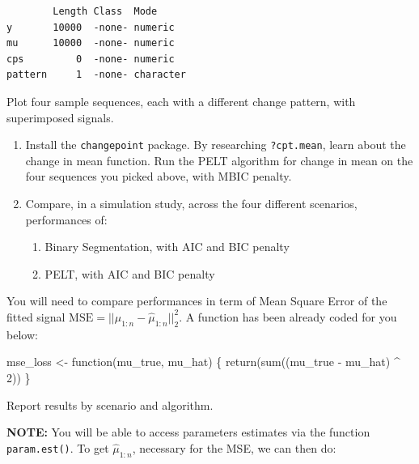 \documentclass[
  letterpaper,
  DIV=11,
  numbers=noendperiod]{scrreprt}
\newenvironment{Shaded}{\begin{snugshade}}{\end{snugshade}}
\newcommand{\AttributeTok}[1]{\textcolor[rgb]{0.40,0.45,0.13}{#1}}
\newcommand{\CommentTok}[1]{\textcolor[rgb]{0.37,0.37,0.37}{#1}}
\newcommand{\ControlFlowTok}[1]{\textcolor[rgb]{0.00,0.23,0.31}{#1}}
\newcommand{\DecValTok}[1]{\textcolor[rgb]{0.68,0.00,0.00}{#1}}
\newcommand{\FunctionTok}[1]{\textcolor[rgb]{0.28,0.35,0.67}{#1}}
\newcommand{\NormalTok}[1]{\textcolor[rgb]{0.00,0.23,0.31}{#1}}
\newcommand{\OtherTok}[1]{\textcolor[rgb]{0.00,0.23,0.31}{#1}}
\newcommand{\SpecialCharTok}[1]{\textcolor[rgb]{0.37,0.37,0.37}{#1}}
\begin{document}
\begin{verbatim}
        Length Class  Mode     
y       10000  -none- numeric  
mu      10000  -none- numeric  
cps         0  -none- numeric  
pattern     1  -none- character
\end{verbatim}

Plot four sample sequences, each with a different change pattern, with
superimposed signals.

\begin{enumerate}
\def\labelenumi{\arabic{enumi}.}
\setcounter{enumi}{1}
\item
  Install the \texttt{changepoint} package. By researching
  \texttt{?cpt.mean}, learn about the change in mean function. Run the
  PELT algorithm for change in mean on the four sequences you picked
  above, with MBIC penalty.
\item
  Compare, in a simulation study, across the four different scenarios,
  performances of:

  \begin{enumerate}
  \def\labelenumii{\alph{enumii}.}
  \item
    Binary Segmentation, with AIC and BIC penalty
  \item
    PELT, with AIC and BIC penalty
  \end{enumerate}
\end{enumerate}

You will need to compare performances in term of Mean Square Error of
the fitted signal \(\text{MSE} = ||\mu_{1:n} - \hat\mu_{1:n}||^2_2\). A
function has been already coded for you below:

\begin{Shaded}
\begin{Highlighting}[]
\NormalTok{mse\_loss }\OtherTok{\textless{}{-}} \ControlFlowTok{function}\NormalTok{(mu\_true, mu\_hat) \{}
  \FunctionTok{return}\NormalTok{(}\FunctionTok{sum}\NormalTok{((mu\_true }\SpecialCharTok{{-}}\NormalTok{ mu\_hat) }\SpecialCharTok{\^{}} \DecValTok{2}\NormalTok{))}
\NormalTok{\}}
\end{Highlighting}
\end{Shaded}

Report results by scenario and algorithm.

\textbf{NOTE:} You will be able to access parameters estimates via the
function \texttt{param.est()}. To get \(\hat\mu_{1:n}\), necessary for
the MSE, we can then do:

\begin{Shaded}
\end{Shaded}
\end{document}
